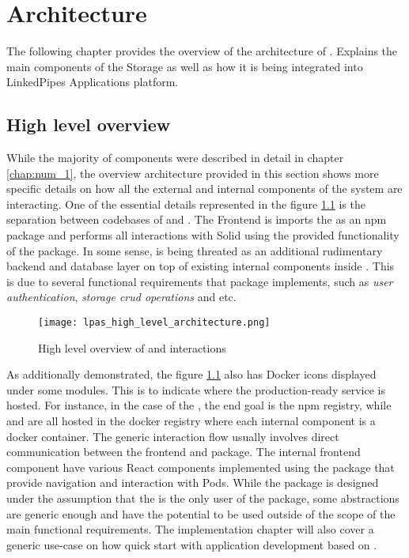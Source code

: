 \chapter{Architecture}
\label{chap:num_4}

The following chapter provides the overview of the architecture of \lpas. Explains the main components of the Storage as well as how it is being integrated into LinkedPipes Applications platform.

\section{High level overview}

While the majority of components were described in detail in chapter  \ref{chap:num_1}, the overview architecture provided in this section shows more specific details on how all the external and internal components of the system are interacting. One of the essential details represented in the figure \ref{fig:lpas_high_level_architecture} is the separation between codebases of \lpa{} and \lpas{}. The \lpa{} Frontend is imports the \lpas{} as an npm package and performs all interactions with Solid using the provided functionality of the package. In some sense, \lpas{} is being threated as an additional rudimentary backend and database layer on top of existing internal components inside \lpa{}. This is due to several functional requirements that \lpas{} package implements,  such as \textit{user authentication}, \textit{storage crud operations} and etc.

\begin{figure}[h]
\centering
\texttt{[image: lpas\_high\_level\_architecture.png]}
\caption{High level overview of \lpa{} and \lpas{} interactions}
\label{fig:lpas_high_level_architecture}
\end{figure}

As additionally demonstrated, the figure \ref{fig:lpas_high_level_architecture} also has Docker icons displayed under some modules. This is to indicate where the production-ready service is hosted. For instance, in the case of the \lpas{}, the end goal is the npm registry, while \lps{} and \lpa{} are all hosted in the docker registry where each internal component is a docker container.
The generic interaction flow usually involves direct communication between the \lpa{} frontend and \lpas{} package. The internal frontend component have various React components implemented using the \lpas{} package that provide navigation and interaction with \solid{} Pods. While the package is designed under the assumption that the \lpa{} is the only user of the package, some abstractions are generic enough and have the potential to be used outside of the scope of the main functional requirements. The implementation chapter will also cover a generic use-case on how quick start with application development based on \solid{}.

